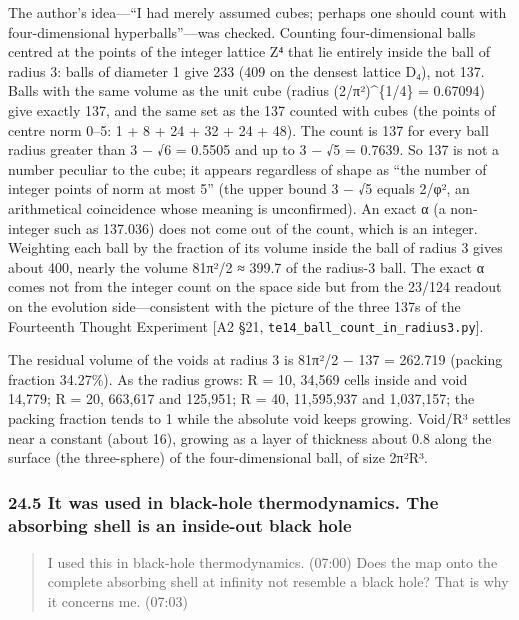 \documentclass[
  a4paper,
]{article}
\begin{document}
The author's idea---``I had merely assumed cubes; perhaps one should
count with four-dimensional hyperballs''---was checked. Counting
four-dimensional balls centred at the points of the integer lattice Z⁴
that lie entirely inside the ball of radius 3: balls of diameter 1 give
233 (409 on the densest lattice D₄), not 137. Balls with the same volume
as the unit cube (radius (2/π²)\^{}\{1/4\} = 0.67094) give exactly 137,
and the same set as the 137 counted with cubes (the points of centre
norm 0--5: 1 + 8 + 24 + 32 + 24 + 48). The count is 137 for every ball
radius greater than 3 − √6 = 0.5505 and up to 3 − √5 = 0.7639. So 137 is
not a number peculiar to the cube; it appears regardless of shape as
``the number of integer points of norm at most 5'' (the upper bound 3 −
√5 equals 2/φ², an arithmetical coincidence whose meaning is
unconfirmed). An exact α (a non-integer such as 137.036) does not come
out of the count, which is an integer. Weighting each ball by the
fraction of its volume inside the ball of radius 3 gives about 400,
nearly the volume 81π²/2 ≈ 399.7 of the radius-3 ball. The exact α comes
not from the integer count on the space side but from the 23/124 readout
on the evolution side---consistent with the picture of the three 137s of
the Fourteenth Thought Experiment {[}A2 §21,
\texttt{te14\_\allowbreak{}ball\_\allowbreak{}count\_\allowbreak{}in\_\allowbreak{}radius3.py}{]}.

The residual volume of the voids at radius 3 is 81π²/2 − 137 = 262.719
(packing fraction 34.27\%). As the radius grows: R = 10, 34,569 cells
inside and void 14,779; R = 20, 663,617 and 125,951; R = 40, 11,595,937
and 1,037,157; the packing fraction tends to 1 while the absolute void
keeps growing. Void/R³ settles near a constant (about 16), growing as a
layer of thickness about 0.8 along the surface (the three-sphere) of the
four-dimensional ball, of size 2π²R³.

\subsubsection{24.5 It was used in black-hole thermodynamics. The
absorbing shell is an inside-out black
hole}\label{it-was-used-in-black-hole-thermodynamics.-the-absorbing-shell-is-an-inside-out-black-hole}

\begin{quote}
I used this in black-hole thermodynamics. (07:00) Does the map onto the
complete absorbing shell at infinity not resemble a black hole? That is
why it concerns me. (07:03)
\end{quote}
\end{document}
